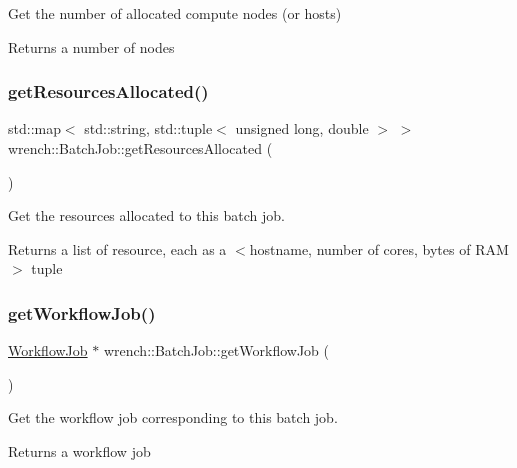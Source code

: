 Get the number of allocated compute nodes (or hosts) 

\begin{DoxyReturn}{Returns}
a number of nodes 
\end{DoxyReturn}
\mbox{\label{classwrench_1_1_batch_job_a22557f2dea0008e1f985b4a373868490}} 
\subsubsection{\texorpdfstring{get\+Resources\+Allocated()}{getResourcesAllocated()}}
{\footnotesize\ttfamily std\+::map$<$ std\+::string, std\+::tuple$<$ unsigned long, double $>$ $>$ wrench\+::\+Batch\+Job\+::get\+Resources\+Allocated (\begin{DoxyParamCaption}{ }\end{DoxyParamCaption})}



Get the resources allocated to this batch job. 

\begin{DoxyReturn}{Returns}
a list of resource, each as a $<$hostname, number of cores, bytes of R\+AM$>$ tuple 
\end{DoxyReturn}
\mbox{\label{classwrench_1_1_batch_job_a5ee5804010f310bf636f7569c3ed80c0}} 
\subsubsection{\texorpdfstring{get\+Workflow\+Job()}{getWorkflowJob()}}
{\footnotesize\ttfamily \hyperlink{classwrench_1_1_workflow_job}{Workflow\+Job} $\ast$ wrench\+::\+Batch\+Job\+::get\+Workflow\+Job (\begin{DoxyParamCaption}{ }\end{DoxyParamCaption})}



Get the workflow job corresponding to this batch job. 

\begin{DoxyReturn}{Returns}
a workflow job 
\end{DoxyReturn}
\mbox{\label{classwrench_1_1_batch_job_adeb38beecfec84bb2e9022d20624ecd0}} 

